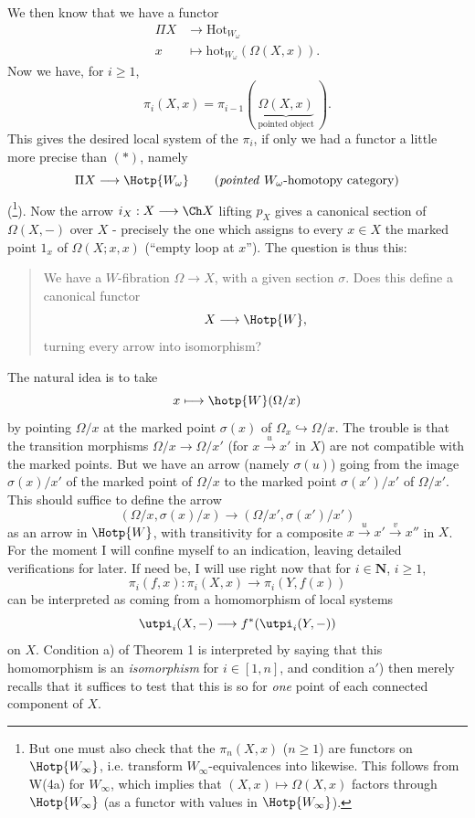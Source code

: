 We then know that we have a functor
\[
\begin{aligned}
\Pi X &\longrightarrow \mathrm{Hot}_{W_\omega}\\
x &\longmapsto \mathrm{hot}_{W_\omega}(\Omega(X,x)).
\end{aligned}
\tag*{$(*)$}
\]
Now we have, for $i \geq 1$,
\[
\pi_i(X,x) = \pi_{i-1}(\ \underbrace{\Omega(X,x)}_{\text{pointed object}}\ ).
\]
This gives the desired local system of the $\pi_i$, if only we had a functor a little more precise than $(*)$, namely
\[
\Pi X \longrightarrow \Hotp{W_\omega} \qquad \text{(\textit{pointed} $W_\omega$-homotopy category)}
\]
(\footnote[114]{But one must also check that the $\pi_n(X,x)$ ($n \geq 1$) are functors on $\Hotp{W_\infty}$, i.e. transform $W_\infty$-equivalences into likewise. This follows from W(4a) for $W_\infty$, which implies that $(X,x) \mapsto \Omega(X,x)$ factors through $\Hotp{W_\infty}$ (as a functor with values in $\Hotp{W_\infty}$).}). Now the arrow $i_X : X \longrightarrow \Ch X$ lifting $p_X$ gives a canonical section of $\Omega(X,-)$ over $X$ -
precisely the one which assigns to every $x \in X$ the marked point $1_x$ of $\Omega(X;x,x)$ (``empty loop at $x$''). The question is thus this:

\begin{quote}
We have a $W$-fibration $\Omega \longrightarrow X$, with a given section $\sigma$. Does this define a canonical functor %
\[
X \longrightarrow \Hotp{W},
\]
turning every arrow into isomorphism?
\end{quote}

The natural idea is to take
\[
x \longmapsto \hotp{W}(\Omega/x)
\]
by pointing $\Omega/x$ at the marked point $\sigma(x)$ of $\Omega_x \hookrightarrow \Omega/x$. The trouble is that the transition morphisms $\Omega/x \longrightarrow \Omega/x'$ (for $x \xrightarrow{u} x'$ in $X$) are not compatible with the marked points. But we have an arrow (namely $\sigma(u)$) going
from the image $\sigma(x)/x'$ of the marked point of $\Omega/x$ to the marked point $\sigma(x')/x'$ of $\Omega/x'$. This should suffice to define the arrow
\[
(\Omega/x,\sigma(x)/x) \longrightarrow (\Omega/x',\sigma(x')/x')
\]
as an arrow in $\Hotp{W}$, with transitivity for a composite $x \xrightarrow{u} x' \xrightarrow{v} x''$ in $X$. For the moment I will confine myself
to an indication, leaving detailed verifications for later. If need be, I will use right now that for $i \in \mathbf{N}$, $i \geq 1$,
\[
\pi_i(f,x) : \pi_i(X,x) \longrightarrow \pi_i(Y,f(x))
\]
can be interpreted as coming from a homomorphism of local systems
\[
\utpi_i(X,-) \longrightarrow f^*(\utpi_i(Y,-))
\]
on $X$. Condition a) of Theorem 1 is interpreted by saying that this homomorphism is an \textit{isomorphism} for $i \in [1,n]$, and condition a$'$) then merely recalls that it suffices to test that this is so for \textit{one} point of each connected component of $X$.

